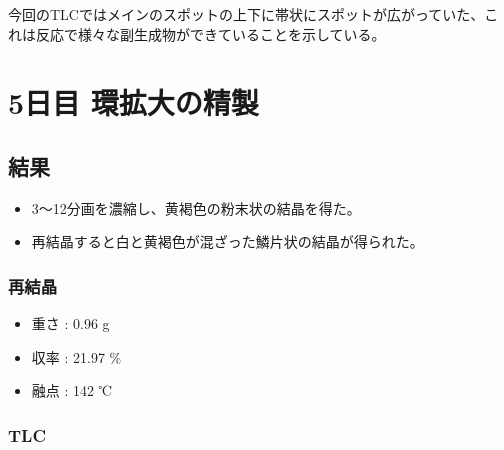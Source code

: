 \documentclass[a4paper,papersize,dvipdfmx]{jsarticle}
\begin{document}
今回のTLCではメインのスポットの上下に帯状にスポットが広がっていた、これは反応で様々な副生成物ができていることを示している。

\section*{5日目 環拡大の精製}
\subsection*{結果}
\begin{itemize}
\item 3〜12分画を濃縮し、黄褐色の粉末状の結晶を得た。
\item 再結晶すると白と黄褐色が混ざった鱗片状の結晶が得られた。
\end{itemize}
\subsubsection*{再結晶}
\begin{itemize}
\item 重さ : 0.96 g
\item 収率 : 21.97 \%
\item 融点 : 142 ℃

\end{itemize}
\subsubsection*{TLC}
\end{document}
